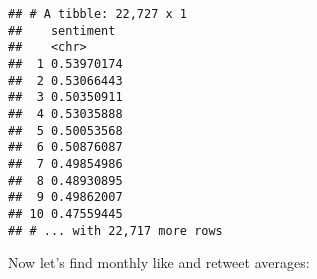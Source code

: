 \documentclass[
]{article}
\newenvironment{Shaded}{\begin{snugshade}}{\end{snugshade}}
\newcommand{\CharTok}[1]{\textcolor[rgb]{0.31,0.60,0.02}{#1}}
\newcommand{\CommentTok}[1]{\textcolor[rgb]{0.56,0.35,0.01}{\textit{#1}}}
\newcommand{\DataTypeTok}[1]{\textcolor[rgb]{0.13,0.29,0.53}{#1}}
\newcommand{\DecValTok}[1]{\textcolor[rgb]{0.00,0.00,0.81}{#1}}
\newcommand{\KeywordTok}[1]{\textcolor[rgb]{0.13,0.29,0.53}{\textbf{#1}}}
\newcommand{\NormalTok}[1]{#1}
\newcommand{\OperatorTok}[1]{\textcolor[rgb]{0.81,0.36,0.00}{\textbf{#1}}}
\newcommand{\StringTok}[1]{\textcolor[rgb]{0.31,0.60,0.02}{#1}}
\begin{document}
\begin{Shaded}
\end{Shaded}

\begin{verbatim}
## # A tibble: 22,727 x 1
##    sentiment 
##    <chr>     
##  1 0.53970174
##  2 0.53066443
##  3 0.50350911
##  4 0.53035888
##  5 0.50053568
##  6 0.50876087
##  7 0.49854986
##  8 0.48930895
##  9 0.49862007
## 10 0.47559445
## # ... with 22,717 more rows
\end{verbatim}

\begin{Shaded}
\end{Shaded}

\bigskip

Now let's find monthly like and retweet averages:

\bigskip
\end{document}
